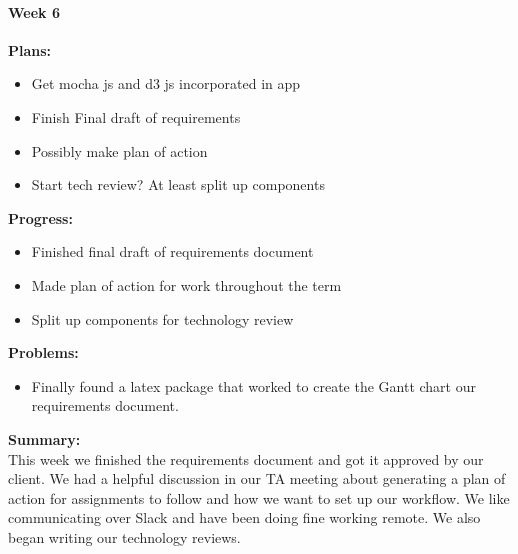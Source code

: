\paragraph{Week 6}
\begin{adjustwidth}{2.5em}{0pt}
    \vspace{-0.5cm}\textbf{Plans:}
    \vspace{-0.5cm}
    \begin{itemize}
        \item Get mocha js and d3 js incorporated in app
        \item Finish Final draft of requirements 
        \item Possibly make plan of action 
        \item Start tech review? At least split up components
    \end{itemize} 
    \vspace{-0.3cm}\textbf{Progress:}
    \vspace{-0.5cm}
    \begin{itemize}
        \item Finished final draft of requirements document
        \item Made plan of action for work throughout the term
        \item Split up components for technology review
    \end{itemize} 
    \vspace{-0.3cm}\textbf{Problems:}
    \vspace{-0.5cm}
    \begin{itemize}
        \item Finally found a latex package that worked to create the Gantt chart our requirements document.
    \end{itemize}  
    \vspace{-0.3cm}\noindent\textbf{Summary:}\\
    \noindent This week we finished the requirements document and got it approved by our client. We had a helpful discussion in our TA meeting about generating a plan of action for assignments to follow and how we want to set up our workflow. We like communicating over Slack and have been doing fine working remote. We also began writing our technology reviews.
\end{adjustwidth} 
